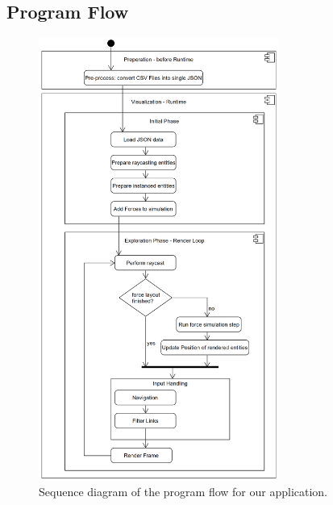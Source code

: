 \subsection{Program Flow}
\label{section:programFlow}
\begin{figure}[!hbt]
    \centering
    \includegraphics[width=0.70\textwidth]{graphics/vrgraph_flow.png}
    \caption{Sequence diagram of the program flow for our application.}
    \label{fig:impl_programFlow}
\end{figure}

